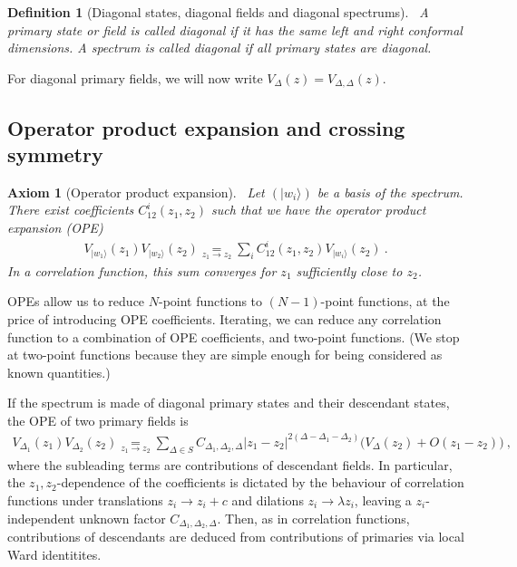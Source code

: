 \documentclass[12pt, a4paper]{article}
\theoremstyle{break}
\newtheorem{hyp}[exo]{Axiom}
\newtheorem{defn}[exo]{Definition}
\begin{document}
\begin{defn}[Diagonal states, diagonal fields and diagonal spectrums]
 ~\label{def:diag}
 A primary state or field is called diagonal if it has the same left and right conformal dimensions. A spectrum is called diagonal if all primary states are diagonal.
\end{defn}
For diagonal primary fields, we will now write  $V_\Delta(z) = V_{\Delta,\Delta}(z)$.


\subsection{Operator product expansion and crossing symmetry}

\begin{hyp}[Operator product expansion]
 ~\label{hyp:ope}
 Let $(|w_i\rangle)$ be a basis of the spectrum.
 There exist coefficients $C^i_{12}(z_1,z_2)$ such that we have the operator product expansion (OPE) 
 \begin{align}
  V_{|w_1\rangle}(z_1)V_{|w_2\rangle}(z_2) \underset{z_1\to z_2}{=} \sum_i C^i_{12}(z_1,z_2) V_{|w_i\rangle}(z_2)\ .
 \end{align}
 In a correlation function,
 this sum converges for $z_1$ sufficiently close to $z_2$.
\end{hyp}
OPEs allow us to reduce $N$-point functions to $(N-1)$-point functions, at the price of introducing OPE coefficients. 
Iterating, we can reduce any correlation function to a combination of OPE coefficients, and two-point functions. (We stop at two-point functions because they are simple enough for being considered as known quantities.) 

If
the spectrum is made of diagonal primary states and their descendant states, the OPE of two primary fields is
\begin{align}
 V_{\Delta_1}(z_1) V_{\Delta_2}(z_2) 
\underset{z_1\to z_2}{=} \sum_{\Delta\in S} C_{\Delta_1,\Delta_2,\Delta} |z_1-z_2|^{2(\Delta-\Delta_1-\Delta_2)}
 \Big(V_{\Delta}(z_2) + O(z_1-z_2) \Big)\ ,
 \label{eq:ope}
\end{align}
where the subleading terms are contributions of descendant fields. 
In particular, the $z_1,z_2$-dependence of the coefficients is dictated by the behaviour
of correlation functions under translations $z_i\to z_i+c$ and dilations $z_i\to\lambda z_i$, leaving a $z_i$-independent unknown factor $C_{\Delta_1,\Delta_2,\Delta}$.
Then, as in correlation functions, contributions of descendants are deduced from contributions of primaries via local Ward identitites.
\end{document}
